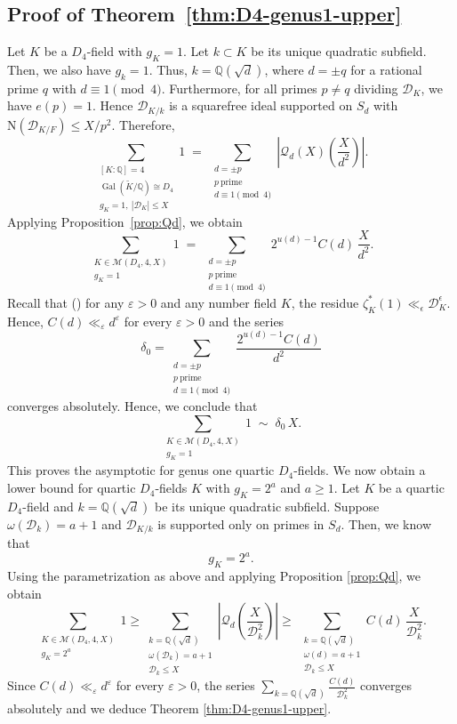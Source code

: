 \documentclass[11pt,reqno]{amsart}
\newcommand{\Q}{\mathbb{Q}}
\newcommand{\cD}{\mathcal{D}}
\newcommand{\cM}{\mathcal{M}}
\DeclareMathOperator{\Gal}{Gal}
\theoremstyle{definition}
\theoremstyle{remark}
\begin{document}
\subsection{Proof of Theorem~\ref{thm:D4-genus1-upper}}
Let $K$ be a $D_4$-field with $g_K=1$. Let $k\subset K$ be its unique quadratic subfield. Then, we also have $g_k=1$. Thus, $k=\Q(\sqrt{d})$,  where 
$d = \pm q$ for a rational prime $q$ with $d \equiv 1 \pmod{4}$.
Furthermore, for all primes $p\neq q$ dividing $\cD_K$, we have $e(p)=1$. Hence $\cD_{K/k}$ is a squarefree ideal supported on $S_d$ with $\mathrm{N}(\mathcal{D}_{K/F}) \leq 
X/p^2$. Therefore,
\[
\sum_{\substack{
[K:\Q]=4\\
\Gal(\widetilde K/\Q)\cong D_4\\
g_K=1,\ |\cD_K|\le X
}}
1
\;=\;
\sum_{\substack{d=\pm p\\ p\ \text{prime}\\ d\equiv 1 \pmod{4}}}
\left|\mathcal{Q}_d(X)\!\left(\frac{X}{d^2}\right)\right|.
\]
Applying Proposition~\ref{prop:Qd}, we obtain
\[
\sum_{\substack{K\in \cM(D_4,4,X)\\ g_K=1}} 1
\;=\;
\sum_{\substack{d=\pm p\\ p\ \text{prime}\\ d\equiv 1 \pmod{4}}}
 2^{u(d)-1}C(d)\,\frac{X}{d^2}.
\]
Recall that (\cite[Chapter XVI, Lemma 1]{Langbook}) for any $\varepsilon>0$ and any number field $K$, the residue $\zeta_K^*(1) \ll_{\epsilon} \cD_K^{\epsilon}$. Hence, $C(d)\ll_{\varepsilon} d^{\varepsilon}$ for every $\varepsilon>0$ and the series 
\begin{equation}
    \delta_0=\sum_{\substack{d=\pm p\\ p\ \text{prime}\\ d\equiv 1 \pmod{4}}}\frac{2^{u(d)-1}C(d)}{d^{2}}
\end{equation}
converges absolutely. Hence, we conclude that 
$$
\sum_{\substack{K\in \cM(D_4,4,X)\\ g_K=1}} 1
\;\sim\;\delta_0\,X.
$$
This proves the asymptotic for genus one quartic $D_4$-fields. We now obtain a lower bound for quartic $D_4$-fields $K$ with $g_K=2^a$ and $a\geq 1$. Let $K$ be a quartic $D_4$-field and $k=\Q(\sqrt{d})$ be its unique quadratic subfield. Suppose $\omega(\cD_k)=a+1$ and $\cD_{K/k}$ is supported only on primes in $S_d$. Then, we know that
$$
    g_K = 2^a.
$$
Using the parametrization as above and applying Proposition \ref{prop:Qd}, we obtain
$$
    \sum_{\substack{K\in \cM(D_4,4,X)\\ g_K=2^a}} 1 \geq \sum_{\substack{k=\Q(\sqrt{d})\\ \omega(\cD_k)=a+1\\ \cD_k\le X}} \left|\mathcal{Q}_d\left(\frac{X}{\cD_k^2}\right)\right|
\geq\;
\sum_{\substack{k=\Q(\sqrt{d})\\ \omega(d)=a+1\\ \cD_k\le X}}
C(d)\,\frac{X}{\cD_k^{2}}.
$$
Since $C(d)\ll_{\varepsilon}d^{\varepsilon}$ for every $\varepsilon>0$, the series $\sum_{k=\Q(\sqrt{d})} \tfrac{C(d)}{\cD_k^2}$ converges absolutely and we deduce Theorem \ref{thm:D4-genus1-upper}.
\end{document}
